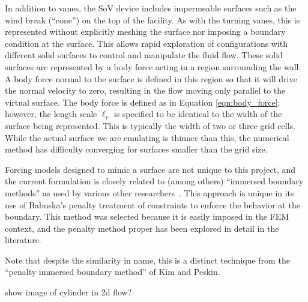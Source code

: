 In addition to vanes, the SoV device includes impermeable surfaces
such as the wind break (``cone'') on the top of the facility. As with
the turning vanes, this is represented without explicitly meshing the
surface nor imposing  a boundary condition at the surface. This allows
rapid exploration of configurations  with different solid surfaces to
control and manipulate the fluid flow. These solid surfaces are
represented by a body force acting in a region surrounding the wall. 
A body force normal to the surface is defined in this region so
that it will drive the normal velocity to zero, resulting in the flow
moving only parallel to the virtual surface. 
The body force is defined as in Equation
\ref{eqn:body_force}; however, the length scale $\ell_v$ is specified to
be identical to the width of the surface being represented. This is
typically the width of two or three grid cells. While the actual surface we are
emulating is thinner than this, the numerical method has difficulty
converging for surfaces smaller than the grid size.  

Forcing models designed to mimic a surface
are not unique to this project, and the current formulation is
 closely related to (among others)
``immersed boundary methods'' as used by various other
researchers~\cite{doi:10.1146/annurev.fluid.37.061903.175743,verzicco1998complex}. This
approach is unique in its use of Babuska's penalty treatment of
constraints\cite{1973fempen,ZAMM:ZAMM19880680925} to enforce the
behavior at the boundary. This method was selected because it is easily
imposed in the FEM context, and the penalty method proper has been
explored in detail in the literature. 

Note that despite the similarity in name, this is a distinct technique
from the ``penalty immersed boundary method'' of Kim and
Peskin\cite{:/content/aip/journal/pof2/19/5/10.1063/1.2734674}.  

show image of cylinder in 2d flow? 



